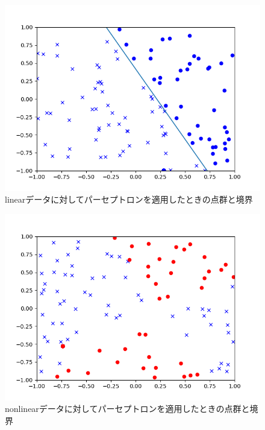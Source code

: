 \documentclass[class=jsarticle, crop=false, dvipdfmx, fleqn]{standalone}
\begin{document}
\begin{figure}
    \centering
    \includegraphics[clip, width=12cm]{../figures/assignment1_1_linear_result}
    \caption{linearデータに対してパーセプトロンを適用したときの点群と境界}
    \label{fig:result1_linear}
\end{figure}

\begin{figure}
    \centering
    \includegraphics[clip, width=12cm]{../figures/assignment1_1_nonlinear_result}
    \caption{nonlinearデータに対してパーセプトロンを適用したときの点群と境界}
    \label{fig:result1_nonlinear}
\end{figure}
\end{document}
